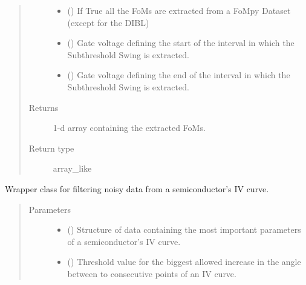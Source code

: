 \documentclass[letterpaper,10pt,english,openany, oneside]{sphinxmanual}
\begin{document}
\begin{fulllineitems}
\begin{quote}
\begin{description}
\begin{itemize}
\item {} 
 () \textendash{} If True all the FoMs are extracted from a FoMpy Dataset (except for the DIBL)

\item {} 
 () \textendash{} Gate voltage defining the start of the interval in which the Subthreshold Swing is extracted.

\item {} 
 () \textendash{} Gate voltage defining the end of the interval in which the Subthreshold Swing is extracted.

\end{itemize}

\item[{Returns}] \leavevmode
{} \textendash{} 1-d array containing the extracted FoMs.

\item[{Return type}] \leavevmode
array\_like

\end{description}\end{quote}

\end{fulllineitems}


\begin{fulllineitems}
\label{\detokenize{index:fompy.wrappers.filter}}
Wrapper class for filtering noisy data from a semiconductor’s IV curve.
\begin{quote}\begin{description}
\item[{Parameters}] \leavevmode\begin{itemize}
\item {} 
 () \textendash{} Structure of data containing the most important parameters of a semiconductor’s IV curve.

\item {} 
 () \textendash{} Threshold value for the biggest allowed increase in the angle between to consecutive points
of an IV curve.

\end{itemize}

\end{description}\end{quote}

\end{fulllineitems}
\end{document}
